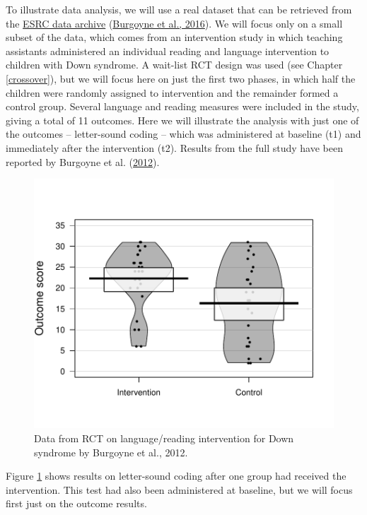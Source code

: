 \documentclass{krantz}
\begin{document}
To illustrate data analysis, we will use a real dataset that can be retrieved from the \href{https://reshare.ukdataservice.ac.uk/852291/}{ESRC data archive} (\protect\hyperlink{ref-burgoyne2016}{Burgoyne et al., 2016}). We will focus only on a small subset of the data, which comes from an intervention study in which teaching assistants administered an individual reading and language intervention to children with Down syndrome. A wait-list RCT design was used (see Chapter \ref{crossover}), but we will focus here on just the first two phases, in which half the children were randomly assigned to intervention and the remainder formed a control group. Several language and reading measures were included in the study, giving a total of 11 outcomes. Here we will illustrate the analysis with just one of the outcomes -- letter-sound coding -- which was administered at baseline (t1) and immediately after the intervention (t2). Results from the full study have been reported by Burgoyne et al. (\protect\hyperlink{ref-burgoyne2012}{2012}).

\begin{center}
\begin{figure}
\includegraphics[width=0.75\linewidth]{images_bw/pirateRCT} \caption{Data from RCT on language/reading intervention for Down syndrome by Burgoyne et al., 2012.}\label{fig:pirateRCT}
\end{figure}
\end{center}

Figure \ref{fig:pirateRCT} shows results on letter-sound coding after one group had received the intervention. This test had also been administered at baseline, but we will focus first just on the outcome results.
\end{document}
